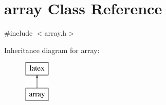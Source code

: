 \hypertarget{classarray}{\section{array Class Reference}
\label{classarray}
}


{\ttfamily \#include $<$array.\-h$>$}

Inheritance diagram for array\-:\begin{figure}[H]
\begin{center}
\leavevmode
\includegraphics[height=2.000000cm]{classarray}
\end{center}
\end{figure}
